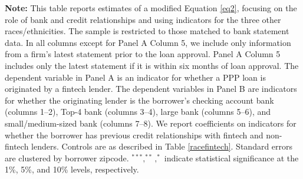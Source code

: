 \documentclass[11pt]{article}
\begin{document}
\newpage 
    \begin{table}[H]
        \begin{adjustbox}{width=\linewidth, center}
            
        \end{adjustbox}

        \begin{minipage}{\linewidth} \medskip
            \footnotesize{{\bf Note: }This table reports estimates of a modified Equation \ref{eq2}, focusing on the role of bank and credit relationships and using indicators for the three other races/ethnicities.   The sample is restricted to those matched to  bank statement data. In all columns except for Panel A Column 5, we include only information from a firm's latest statement prior to the loan approval. Panel A Column 5 includes only the latest statement if it is within six months of loan approval. The dependent variable in Panel A is an indicator for whether a PPP loan is originated by a fintech lender. The dependent variables in Panel B are indicators for whether the originating lender is the borrower's checking account bank (columns 1--2), Top-4 bank (columns 3--4), large bank (columns 5--6), and small/medium-sized bank (columns 7--8). We report coefficients on indicators for whether the borrower has previous credit relationships with fintech and non-fintech lenders. Controls are as described in Table \ref{racefintech}. Standard errors are clustered by borrower zipcode. $^{***}, ^{**}, ^{*}$ indicate statistical significance at the 1\%, 5\%, and 10\% levels, respectively.}
        \end{minipage}
    \end{table} 
\end{document}
